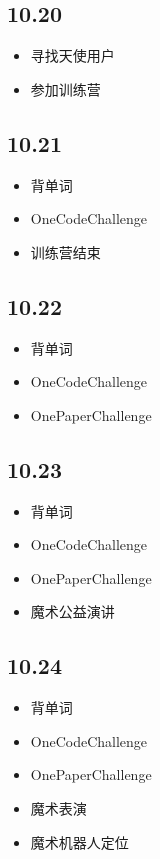 \documentclass[UTF8]{ctexart}
\begin{document}
\subsection*{10.20}
\begin{itemize}
    \item 寻找天使用户
    \item 参加训练营
\end{itemize}

\subsection*{10.21}
\begin{itemize}
    \item 背单词
    \item OneCodeChallenge
    \item 训练营结束
\end{itemize}

\subsection*{10.22}
\begin{itemize}
    \item 背单词
    \item OneCodeChallenge
    \item OnePaperChallenge
\end{itemize}

\subsection*{10.23}
\begin{itemize}
    \item 背单词
    \item OneCodeChallenge
    \item OnePaperChallenge
    \item 魔术公益演讲
\end{itemize}

\subsection*{10.24}
\begin{itemize}
    \item 背单词
    \item OneCodeChallenge
    \item OnePaperChallenge
    \item 魔术表演
    \item 魔术机器人定位
\end{itemize}
\end{document}
